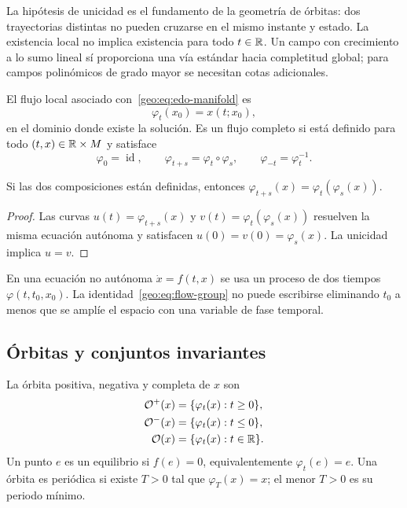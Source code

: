 La hipótesis de unicidad es el fundamento de la geometría de órbitas: dos
trayectorias distintas no pueden cruzarse en el mismo instante y estado. La
existencia local no implica existencia para todo \(t\in\mathbb{R}\). Un campo con
crecimiento a lo sumo lineal sí proporciona una vía estándar hacia completitud
global; para campos polinómicos de grado mayor se necesitan cotas adicionales.

\begin{definition}
El flujo local asociado con~\eqref{geo:eq:edo-manifold} es
\begin{equation}
 \varphi_t(x_0)=x(t;x_0),
 \label{geo:eq:flow}
\end{equation}
en el dominio donde existe la solución. Es un flujo completo si está definido
para todo \((t,x)\in\mathbb{R}\times M\) y satisface
\begin{equation}
 \varphi_0=\operatorname{id},\qquad
 \varphi_{t+s}=\varphi_t\circ\varphi_s,
 \qquad \varphi_{-t}=\varphi_t^{-1}.
 \label{geo:eq:flow-group}
\end{equation}
\end{definition}

\begin{proposition}
Si las dos composiciones están definidas, entonces
\(\varphi_{t+s}(x)=\varphi_t(\varphi_s(x))\).
\end{proposition}

\begin{proof}
Las curvas \(u(t)=\varphi_{t+s}(x)\) y
\(v(t)=\varphi_t(\varphi_s(x))\) resuelven la misma ecuación autónoma y
satisfacen \(u(0)=v(0)=\varphi_s(x)\). La unicidad implica \(u=v\).
\end{proof}

\begin{remark}
En una ecuación no autónoma \(\dot x=f(t,x)\) se usa un proceso de dos tiempos
\(\varphi(t,t_0,x_0)\). La identidad~\eqref{geo:eq:flow-group} no puede
escribirse eliminando \(t_0\) a menos que se amplíe el espacio con una variable
de fase temporal.
\end{remark}

\subsection{Órbitas y conjuntos invariantes}

\begin{definition}
La órbita positiva, negativa y completa de \(x\) son
\begin{align}
 \mathcal O^+(x)&=\{\varphi_t(x):t\ge0\},\nonumber\\
 \mathcal O^-(x)&=\{\varphi_t(x):t\le0\},\nonumber\\
 \mathcal O(x)&=\{\varphi_t(x):t\in\mathbb{R}\}.
 \label{geo:eq:orbits}
\end{align}
Un punto \(e\) es un equilibrio si \(f(e)=0\), equivalentemente
\(\varphi_t(e)=e\). Una órbita es periódica si existe \(T>0\) tal que
\(\varphi_T(x)=x\); el menor \(T>0\) es su periodo mínimo.
\end{definition}


